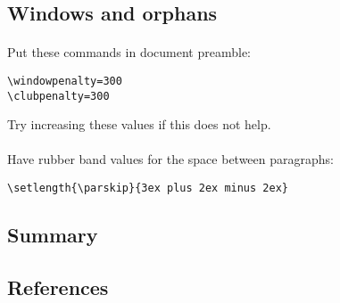 \subsection{Windows and orphans}

\paragraph{}
Put these commands in document preamble:
\begin{verbatim}
\windowpenalty=300
\clubpenalty=300
\end{verbatim}
Try increasing these values if this does not help.

\paragraph{}
Have rubber band values for the space between paragraphs:
\begin{verbatim}
\setlength{\parskip}{3ex plus 2ex minus 2ex}
\end{verbatim}

\subsection{Summary}
\subsection{References}

